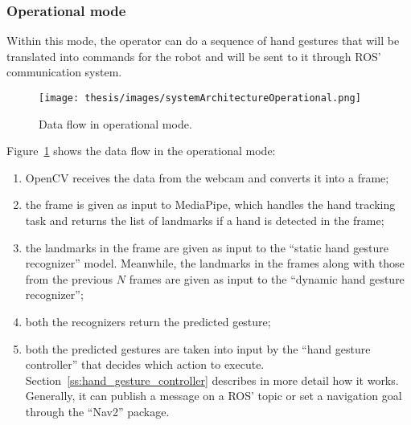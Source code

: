 \documentclass[../thesis.tex]{subfiles}
\begin{document}
\subsubsection{Operational mode}\label{sss:operational_mode}
Within this mode, the operator can do a sequence of hand gestures that will be translated into commands for the robot and will be sent to it through \acrshort{ROS}' communication system.
\begin{figure}[H]
    \centering
    \texttt{[image: thesis/images/systemArchitectureOperational.png]}
    \caption{Data flow in operational mode.}
    \label{fig:system_architecture_operational}
\end{figure}

Figure~\ref{fig:system_architecture_operational} shows the data flow in the operational mode:
\begin{enumerate}
    \item OpenCV receives the data from the webcam and converts it into a frame;
    \item the frame is given as input to MediaPipe, which handles the hand tracking task and returns the list of landmarks if a hand is detected in the frame;
    \item the landmarks in the frame are given as input to the ``static hand gesture recognizer'' model. Meanwhile, the landmarks in the frames along with those from the previous $N$ frames are given as input to the ``dynamic hand gesture recognizer'';
    \item both the recognizers return the predicted gesture;
    \item both the predicted gestures are taken into input by the ``hand gesture controller'' that decides which action to execute. Section~\ref{ss:hand_gesture_controller} describes in more detail how it works. Generally, it can publish a message on a \acrshort{ROS}' topic or set a navigation goal through the ``Nav2'' package.
\end{enumerate}
\end{document}

